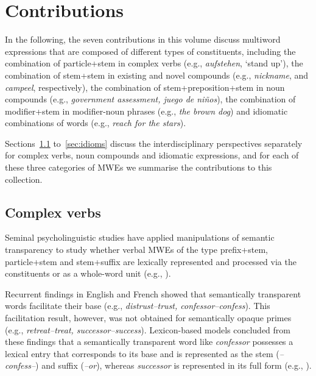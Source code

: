 \documentclass[output=paper]{langsci/langscibook}
\begin{document}
\section{Contributions}

In the following, the seven contributions in this volume discuss multiword expressions
that are composed of different types of constituents, including the
combination of particle+stem in complex verbs (e.g.,
\textit{aufstehen}, `stand up’), the combination of stem+stem in existing and novel compounds (e.g., \textit{nickname}, and \textit{campeel}, respectively), the combination of stem+preposition+stem in noun compounds (e.g., \textit{government assessment, juego de niños}), the combination of
modifier+stem in modifier-noun phrases (e.g., \textit{the brown dog})
and idiomatic combinations of words (e.g., \textit{reach for the
  stars}).

Sections~\ref{sec:verbs} to~\ref{sec:idioms} discuss the
interdisciplinary perspectives separately for complex verbs, noun
compounds and idiomatic expressions, and for each of these three
categories of MWEs we summarise the contributions to this collection.


\subsection{Complex verbs}
\label{sec:verbs}

Seminal psycholinguistic studies have applied manipulations of
semantic transparency to study whether verbal MWEs of the type
prefix+stem, particle+stem and stem+suffix are lexically represented
and processed via the constituents or as a whole-word unit (e.g.,
\citealt{Taft/Forster:75, MarslenWilsonEtAl:94, LongtinEtAl:03}).

Recurrent findings in English and French showed that semantically
transparent words facilitate their base (e.g.,
\textit{distrust--trust, confessor--confess}). This facilitation
result, however, was not obtained for semantically opaque primes
(e.g., \textit{retreat--treat, successor--success}). Lexicon-based
models concluded from these findings that a semantically transparent
word like \textit{confessor} possesses a lexical entry that
corresponds to its base and is represented as the stem
(\textit{--confess--}) and suffix (\textit{--or}), whereas
\textit{successor} is represented in its full form (e.g.,
\citealt{RastleEtAl:00, FeldmanEtAl:04, DiependaeleEtAl:05,
  Meunier/Longtin:07, MarslenWilsonEtAl:08, DiependaeleEtAl:09,
  Taft/NguyenHoan:10}).
\end{document}
